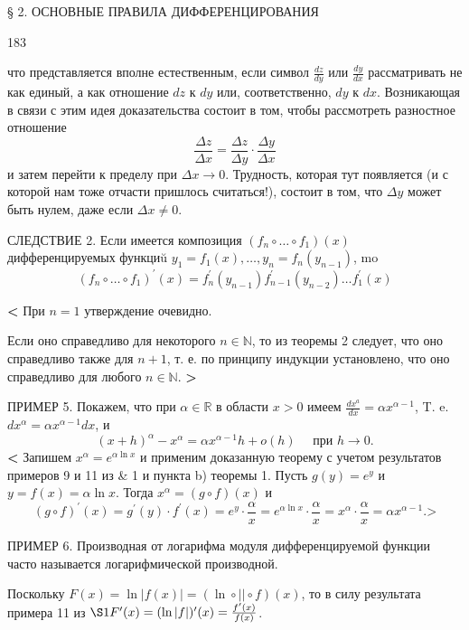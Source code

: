 \documentclass{article}
\begin{document}
\thispagestyle{empty}

\begin{scriptsize} § 2. ОСНОВНЫЕ ПРАВИЛА ДИФФЕРЕНЦИРОВАНИЯ \end{scriptsize} 
\hfill 183
\bigskip

что представляется вполне естественным, если символ $\frac{d z}{d y}$ или $\frac{d y}{d x}$ рассматривать не как единый, а как отношение $d z$ к $d y$ или, соответственно, $d y$ к $d x$.
Возникающая в связи с этим идея доказательства состоит в том, чтобы рассмотреть разностное отношение
$$
\frac{\Delta z}{\Delta x}=\frac{\Delta z}{\Delta y} \cdot \frac{\Delta y}{\Delta x}
$$
и затем перейти к пределу при $\Delta x \rightarrow 0$. Трудность, которая тут появляется (и с которой нам тоже отчасти пришлось считаться!), состоит в том, что $\Delta y$ может быть нулем, даже если $\Delta x \neq 0$.

СЛЕДСТВИЕ 2. Если имеется композиция $\left(f_n \circ \ldots \circ f_1\right)(x)$ дифференцируемых функциŭ $y_1=f_1(x), \ldots, y_n=f_n\left(y_{n-1}\right)$, mo
$$
\left(f_n \circ \ldots \circ f_1\right)^{\prime}(x)=f_n^{\prime}\left(y_{n-1}\right) f_{n-1}^{\prime}\left(y_{n-2}\right) \ldots f_1^{\prime}(x)
$$

\textbf{<} При $n=1$ утверждение очевидно. \mbox{}\hfill

Если оно справедливо для некоторого $n \in \mathbb{N}$, то из теоремы 2 следует, что оно справедливо также для $n+1$, т. е. по принципу индукции установлено, что оно справедливо для любого $n \in \mathbb{N}$. \textbf{>}

ПРИМЕР 5. Покажем, что при $\alpha \in \mathbb{R}$ в области $x>0$ имеем $\frac{d x^a}{d x}=\alpha x^{\alpha-1}$, T. e. $d x^\alpha=\alpha x^{\alpha-1} d x$, и
$$
(x+h)^\alpha-x^\alpha=\alpha x^{\alpha-1} h+o(h) \quad \text { при } h \rightarrow 0 .
$$
\textbf{<} Запишем $x^\alpha=e^{\alpha \ln x}$ и применим доказанную теорему с учетом результатов примеров 9 и 11 из \& 1 и пункта b) теоремы 1.
Пусть $g(y)=e^y$ и $y=f(x)=\alpha \ln x$. Тогда $x^\alpha=(g \circ f)(x)$ и
$$
(g \circ f)^{\prime}(x)=g^{\prime}(y) \cdot f^{\prime}(x)=e^y \cdot \frac{\alpha}{x}=e^{\alpha \ln x} \cdot \frac{\alpha}{x}=x^\alpha \cdot \frac{\alpha}{x}=\alpha x^{\alpha-1} . \textbf{>}
$$

ПРИМЕР 6. Производная от логарифма модуля дифференцируемой функции часто называется логарифмической производной.

Поскольку $F(x)=\ln |f(x)|=(\ln \circ|| \circ f)(x)$, то в силу результата примера 11 из $\S 1 F^{\prime}(x)=(\ln |f|)^{\prime}(x)=\frac{f^{\prime}(x)}{f(x)}$.
\end{document}
